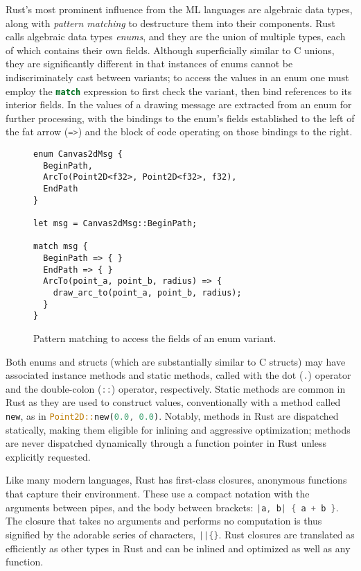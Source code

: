 Rust's most prominent influence from the ML languages are algebraic data types,
along with \emph{pattern matching} to destructure
them into their components. Rust calls algebraic data types \emph{enums},
and they are the union of multiple types,
each of which contains their own fields. Although superficially
similar to C unions, they are significantly different in that
instances of enums cannot be indiscriminately cast between
variants; to access the values in an enum one must employ the \lstinline[language=Rust]{match}
expression to first check the variant, then bind references
to its interior fields. In  the values of
a drawing message are extracted from an enum for further processing,
with the bindings to the enum's fields established to the left of the
fat arrow (\lstinline[language=Rust]{=>}) and the block of code operating
on those bindings to the right.

\begin{figure}
\begin{lstlisting}
enum Canvas2dMsg {
  BeginPath,
  ArcTo(Point2D<f32>, Point2D<f32>, f32),
  EndPath
}

let msg = Canvas2dMsg::BeginPath;

match msg {
  BeginPath => { }
  EndPath => { }
  ArcTo(point_a, point_b, radius) => {
    draw_arc_to(point_a, point_b, radius);
  }
}
\end{lstlisting}
  \caption{Pattern matching to access the fields of an enum variant.}
  \label{fig:enums}
\end{figure}

Both enums and structs (which are substantially similar to C structs)
may have associated instance methods and static methods, called with the dot
(\lstinline[language=Rust]{.}) operator and the double-colon
(\lstinline[language=Rust]{::}) operator, respectively.
Static methods are common in Rust as they are used to construct
values, conventionally with a method called
\lstinline[language=Rust]{new}, as in
\lstinline[language=Rust]{Point2D::new(0.0, 0.0)}.
Notably, methods in Rust are dispatched statically, making them
eligible for inlining and aggressive optimization; methods are never
dispatched dynamically through a function pointer in Rust unless
explicitly requested.

Like many modern languages, Rust has first-class closures,
anonymous functions that capture their environment. These
use a compact notation with the arguments between pipes,
and the body between brackets: \lstinline[language=Rust]~|a, b| { a + b }~.
The closure that takes no arguments and performs no computation is
thus signified by the adorable series of characters, \lstinline[language=Rust]~||{}~.
Rust closures are translated as efficiently as other types
in Rust and can be inlined and optimized as well as any function.

